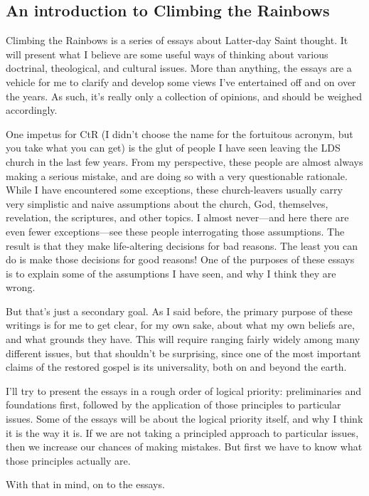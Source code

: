 \subsection{An introduction to Climbing the Rainbows}

	Climbing the Rainbows is a series of essays about Latter-day Saint thought. It will present what I believe are some useful ways of thinking about various doctrinal, theological, and cultural issues. More than anything, the essays are a vehicle for me to clarify and develop some views I've entertained off and on over the years. As such, it's really only a collection of opinions, and should be weighed accordingly.

	One impetus for CtR (I didn't choose the name for the fortuitous acronym, but you take what you can get) is the glut of people I have seen leaving the LDS church in the last few years. From my perspective, these people are almost always making a serious mistake, and are doing so with a very questionable rationale. While I have encountered some exceptions, these church-leavers usually carry very simplistic and naive assumptions about the church, God, themselves, revelation, the scriptures, and other topics. I almost never---and here there are even fewer exceptions---see these people interrogating those assumptions. The result is that they make life-altering decisions for bad reasons. The least you can do is make those decisions for good reasons! One of the purposes of these essays is to explain some of the assumptions I have seen, and why I think they are wrong.

	But that's just a secondary goal. As I said before, the primary purpose of these writings is for me to get clear, for my own sake, about what my own beliefs are, and what grounds they have. This will require ranging fairly widely among many different issues, but that shouldn't be surprising, since one of the most important claims of the restored gospel is its universality, both on and beyond the earth.

	I'll try to present the essays in a rough order of logical priority: preliminaries and foundations first, followed by the application of those principles to particular issues. Some of the essays will be about the logical priority itself, and why I think it is the way it is. If we are not taking a principled approach to particular issues, then we increase our chances of making mistakes. But first we have to know what those principles actually are.
	
	With that in mind, on to the essays.